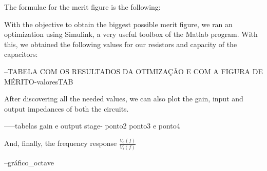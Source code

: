 The formulae for the merit figure is the following:


With the objective to obtain the biggest possible merit figure, we ran an optimization using Simulink, a very useful toolbox of the Matlab program. With this, we obtained the following values for our resistors and capacity of the capacitors:

--TABELA COM OS RESULTADOS DA OTIMIZAÇÃO E COM A FIGURA DE MÉRITO-valoresTAB

After discovering all the needed values, we can also plot the gain, input and output impedances of both the circuits.

-----tabelas gain e output stage- ponto2 ponto3 e ponto4

And, finally, the frequency response $\frac{V_o(f)}{V_i(f)}$


--gráfico_octave


